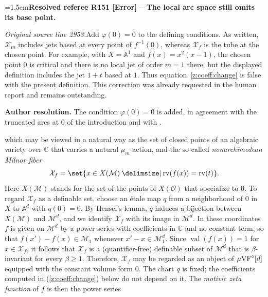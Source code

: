 \documentclass[12pt]{amsart}
\newcommand{\ResolvedRefereeRemark}[5]{%
  \par\medskip\begingroup\normalfont\small\color{gray}%
  \emergencystretch=1.5em\noindent\textbf{Resolved referee R#1 [#2] -- #3.}\par\nobreak\noindent #4\par
  \medskip\color{ResolutionGreen}\noindent\textbf{Author resolution.} #5\par
  \endgroup\medskip
}
\newcommand{\memph}[1]{{\color{magenta}\emph{#1}}}
\theoremstyle{plain}
\theoremstyle{definition}
\theoremstyle{remark}
\numberwithin{equation}{section}
\theoremstyle{plain}
\newcommand{\VF}{\textup{VF}}
\newcommand{\MM}{\mdl M}
\newcommand{\OO}{\mdl O}
\newcommand{\A}{\mathds{A}}
\newcommand{\C}{\mathds{C}}
\newcommand{\0}{\emptyset}
\newcommand{\mdl}[1]{\mathcal{#1}}  %
\providecommand\given{}
\newcommand\SetSymbol[1][]{%
\nonscript \: #1 \vert
\allowbreak
\nonscript\:
\mathopen{}}
\renewcommand\given{\SetSymbol[\delimsize]}
\newcommand{\mgVF}{{\mu} {\VF}}
\DeclareMathOperator{\rv}{rv}
\DeclareMathOperator{\vv}{val}
\begin{document}
\ResolvedRefereeRemark{151}{Error}{The local arc space still omits its base point}{%
\textit{Original source line 2953.}\quad Add $\varphi(0)=0$ to the defining conditions. As written, $\mdl X_m$ includes jets based at every point of $f^{-1}(0)$, whereas $\mdl X_f$ is the tube at the chosen point. For example, with $X=\A^1$ and $f(x)=x^2(x-1)$, the chosen point $0$ is critical and there is no local jet of order $m=1$ there, but the displayed definition includes the jet $1+t$ based at $1$. Thus equation~\eqref{z:coeff:change} is false with the present definition. This correction was already requested in the human report and remains outstanding.
}{The condition $\varphi(0)=0$ is added, in agreement with the truncated arcs at $0$ of the introduction and with \cite[(8.3.3)]{hru:loe:lef}.}
which may be viewed in a natural way as the set of closed points of an algebraic variety over $\C$ that carries a natural $\mu_{m}$-action, and the so-called \memph{nonarchimedean Milnor fiber}
\[
\mdl X_f = \set{ x \in X(\MM) \given \rv(f(x)) = \rv(t)}.
\]
Here $X(\MM)$ stands for the set of the points of $X(\OO)$ that specialize to $0$. To regard $\mdl X_f$ as a definable set, choose an \'etale map $q$ from a neighborhood of $0$ in $X$ to $\A^d$ with $q(0) = 0$. By Hensel's lemma, $q$ induces a bijection between $X(\MM)$ and $\MM^d$, and we identify $\mdl X_f$ with its image in $\MM^d$. In these coordinates $f$ is given on $\MM^d$ by a power series with coefficients in $\C$ and no constant term, so that $f(x') - f(x) \in \MM_1$ whenever $x' - x \in \MM_1^d$. Since $\vv(f(x)) = 1$ for $x \in \mdl X_f$, it follows that $\mdl X_f$ is a (quantifier-free) definable subset of $\MM^d$ that is $\beta$-invariant for every $\beta \geq 1$. Therefore, $\mdl X_f$ may be regarded as an object of $\mgVF^\diamond[d]$ equipped with the constant volume form $0$. The chart $q$ is fixed; the coefficients computed in (\ref{z:coeff:change}) below do not depend on it. The  \memph{motivic zeta function} of $f$ is then the power series
\end{document}
